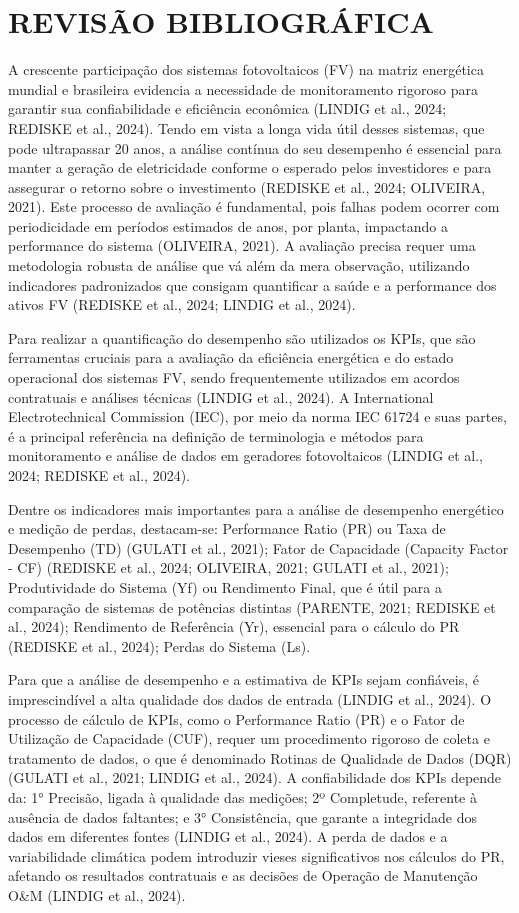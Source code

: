 \renewcommand{\chaptername}{} %
\chapter{REVISÃO BIBLIOGRÁFICA}

A crescente participação dos sistemas fotovoltaicos (FV) na matriz energética mundial e brasileira evidencia a necessidade de monitoramento rigoroso para garantir sua confiabilidade e eficiência econômica (LINDIG et al., 2024; REDISKE et al., 2024). Tendo em vista a longa vida útil desses sistemas, que pode ultrapassar 20 anos, a análise contínua do seu desempenho é essencial para manter a geração de eletricidade conforme o esperado pelos investidores e para assegurar o retorno sobre o investimento (REDISKE et al., 2024; OLIVEIRA, 2021). Este processo de avaliação é fundamental, pois falhas podem ocorrer com periodicidade em períodos estimados de anos, por planta, impactando a performance do sistema (OLIVEIRA, 2021). A avaliação precisa requer uma metodologia robusta de análise que vá além da mera observação, utilizando indicadores padronizados que consigam quantificar a saúde e a performance dos ativos FV (REDISKE et al., 2024; LINDIG et al., 2024).

Para realizar a quantificação do desempenho são utilizados os KPIs, que são ferramentas cruciais para a avaliação da eficiência energética e do estado operacional dos sistemas FV, sendo frequentemente utilizados em acordos contratuais e análises técnicas (LINDIG et al., 2024). A International Electrotechnical Commission (IEC), por meio da norma IEC 61724 e suas partes, é a principal referência na definição de terminologia e métodos para monitoramento e análise de dados em geradores fotovoltaicos (LINDIG et al., 2024; REDISKE et al., 2024).

Dentre os indicadores mais importantes para a análise de desempenho energético e medição de perdas, destacam-se: Performance Ratio (PR) ou Taxa de Desempenho (TD) (GULATI et al., 2021); Fator de Capacidade (Capacity Factor - CF) (REDISKE et al., 2024; OLIVEIRA, 2021; GULATI et al., 2021); Produtividade do Sistema (Yf) ou Rendimento Final, que é útil para a comparação de sistemas de potências distintas (PARENTE, 2021; REDISKE et al., 2024); Rendimento de Referência (Yr), essencial para o cálculo do PR (REDISKE et al., 2024); Perdas do Sistema (Ls).

Para que a análise de desempenho e a estimativa de KPIs sejam confiáveis, é imprescindível a alta qualidade dos dados de entrada (LINDIG et al., 2024). O processo de cálculo de KPIs, como o Performance Ratio (PR) e o Fator de Utilização de Capacidade (CUF), requer um procedimento rigoroso de coleta e tratamento de dados, o que é denominado Rotinas de Qualidade de Dados (DQR) (GULATI et al., 2021; LINDIG et al., 2024). A confiabilidade dos KPIs depende da: 1° Precisão, ligada à qualidade das medições; 2º Completude, referente à ausência de dados faltantes; e 3° Consistência, que garante a integridade dos dados em diferentes fontes (LINDIG et al., 2024). A perda de dados e a variabilidade climática podem introduzir vieses significativos nos cálculos do PR, afetando os resultados contratuais e as decisões de Operação de Manutenção O\&M (LINDIG et al., 2024).

